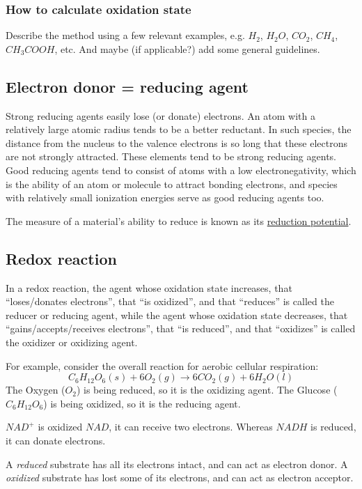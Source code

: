\documentclass[a4paper,14pt]{extarticle}
\begin{document}
\subsubsection{How to calculate oxidation state}
Describe the method using a few relevant examples, e.g. $H_2$, $H_2O$, $CO_2$, $CH_4$,
$CH_3COOH$, etc. And maybe (if applicable?) add some general guidelines.

\subsection{Electron donor = reducing agent}
Strong reducing agents easily lose (or donate) electrons. An atom with a relatively large
atomic radius tends to be a better reductant. In such species, the distance from the
nucleus to the valence electrons is so long that these electrons are not strongly
attracted. These elements tend to be strong reducing agents. Good reducing agents tend to
consist of atoms with a low electronegativity, which is the ability of an atom or molecule
to attract bonding electrons, and species with relatively small ionization energies serve
as good reducing agents too.

The measure of a material's ability to reduce is known as its
\href{https://en.wikipedia.org/wiki/Reduction_potential}{reduction potential}.

\subsection{Redox reaction}
In a redox reaction, the agent whose oxidation state increases, that ``loses/donates
electrons'', that ``is oxidized'', and that ``reduces'' is called the reducer or reducing
agent, while the agent whose oxidation state decreases, that ``gains/accepts/receives
electrons'', that ``is reduced'', and that ``oxidizes'' is called the oxidizer or
oxidizing agent.

For example, consider the overall reaction for aerobic cellular respiration:
\[
    C_6H_{12}O_6(s) + 6O_2(g) \rightarrow 6CO_2(g) + 6H_2O(l)
\]
The Oxygen ($O_2$) is being reduced, so it is the oxidizing agent. The Glucose
($C_6H_{12}O_6$) is being oxidized, so it is the reducing agent.

$NAD^+$ is oxidized $NAD$, it can receive two electrons.
Whereas $NADH$ is reduced, it can donate electrons.

A {\em reduced\/} substrate has all its electrons intact, and can act as electron donor.
A {\em oxidized\/} substrate has lost some of its electrons, and can act as electron
acceptor.
\end{document}
